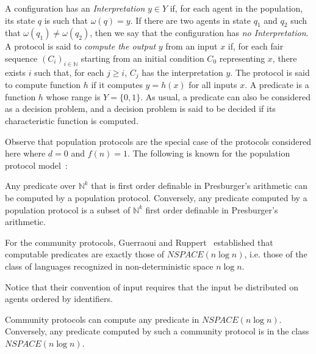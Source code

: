 \documentclass[UKenglish]{llncs}
\newcommand\motnouv[1]{{\emph{#1}}}
\newcommand\N{\mathbb{N}}
\begin{document}
A configuration has an \motnouv{Interpretation} $y\in Y$ if, for each agent in the
population, its state $q$ is such that $\omega(q)=y$. If there are two agents in state
$q_1$ and $q_2$ such that $\omega(q_1)\ne\omega(q_2)$, then we say that the
configuration has \motnouv{no Interpretation}.
A protocol is said to \motnouv{compute the output} $y$ from an input $x$  if,
for each fair sequence $(C_i)_{i\in\mathbb{N}}$ starting from an
initial condition $C_0$ representing $x$, there exists $i$
such that, for each $j\ge i$, $C_j$ has the interpretation $y$.
The protocol is said to compute function $h$ if
it computes $y=h(x)$ for all inputs $x$.
A predicate is a function $h$ whose range is 
$Y=\{0,1\}$. As usual, a predicate can also
be considered as a decision problem, and a decision problem is said to
be decided if its characteristic function is computed. 






Observe that  population protocols 
\cite{angluin2007cpp,AspnesADFP2004} are the special case  of the
protocols considered here where $d=0$ and $f(n)=1$.
The following is known for the population protocol model~\cite{angluin2007cpp,AspnesADFP2004}: 

\begin{theorem}
Any predicate over $\N^k$ that is first order definable in
Presburger's arithmetic can be computed by a population protocol.
Conversely, 
any predicate computed by a population protocol is a subset of
$\N^k$ first order definable in
Presburger's arithmetic.
\end{theorem}










For the community protocols, Guerraoui and Ruppert~\cite{guerraoui2009names} 
established     that computable predicates
are exactly those of $NSPACE(n\log n)$, i.e. those of  the class
  of languages recognized in non-deterministic space $n\log n$.


Notice that their
convention \cite{guerraoui2009names}  of input   requires that the input be distributed on agents ordered by
identifiers. 







\begin{theorem} \label{th:eux}
Community protocols can compute  any predicate in $NSPACE(n\log n)$. 
Conversely, any predicate computed by such a 
community protocol is in the class $NSPACE(n\log n)$.
\end{theorem}
\end{document}
